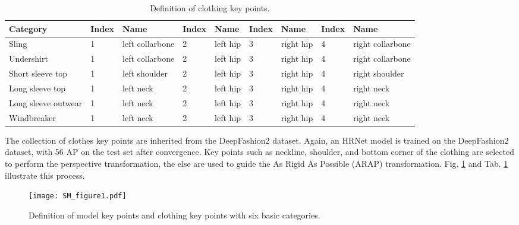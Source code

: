 \documentclass[10pt,twocolumn,letterpaper]{article}
\begin{document}
\begin{table}[h]
    \caption{Definition of clothing key points.}
    \label{tab:clothing_keypoints}
    \centering
    \begin{tabular}{lllllllll}
        \toprule
        Category & Index & Name & Index & Name & Index & Name & Index & Name \\ 
        \midrule
        Sling & 1 & left collarbone & 2 & left hip & 3 & right hip & 4 & right collarbone\\ 
        Undershirt & 1 & left collarbone & 2 & left hip & 3 & right hip & 4 & right collarbone\\ 
        Short sleeve top & 1 & left shoulder & 2 & left hip & 3 & right hip & 4 & right shoulder\\ 
        Long sleeve top & 1 & left neck & 2 & left hip & 3 & right hip & 4 & right neck\\ 
        Long sleeve outwear & 1 & left neck & 2 & left hip & 3 & right hip & 4 & right neck\\ 
        Windbreaker & 1 & left neck & 2 & left hip & 3 & right hip & 4 & right neck\\ 
        \bottomrule
    \end{tabular}
\end{table}

The collection of clothes key points are inherited from the DeepFashion2 \cite{ge2019deepfashion2} dataset. Again, an HRNet model is trained on the DeepFashion2 dataset, with 56 AP on the test set after convergence. Key points such as neckline, shoulder, and bottom corner of the clothing are selected to perform the perspective transformation, the else are used to guide the As Rigid As Possible (ARAP) \cite{alexa2000rigid,igarashi2005rigid} transformation. Fig. \ref{fig: SM_keypoints_model_cloth} and Tab. \ref{tab:clothing_keypoints} illustrate this process.

\begin{figure}[h]
  \centering
  \texttt{[image: SM\_figure1.pdf]}
  \caption{Definition of model key points and clothing key points with six basic categories.}\label{fig: SM_keypoints_model_cloth}
\end{figure}
\end{document}
